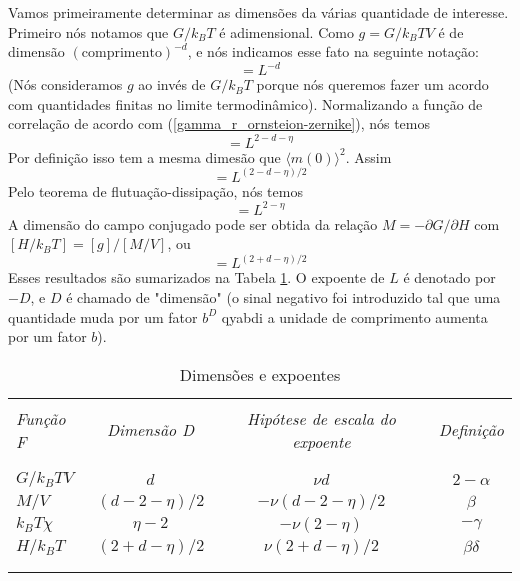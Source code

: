 Vamos primeiramente determinar as dimensões da várias quantidade de interesse. Primeiro nós notamos que $G/k_{B}T$ é adimensional. Como $g=G/k_{B}TV$ é de dimensão $(\text{comprimento})^{-d}$, e nós indicamos esse fato na seguinte notação:
\begin{equation}
[g]=L^{-d}
\end{equation}
(Nós consideramos $g$ ao invés de $G/k_{B}T$ porque nós queremos fazer um acordo com quantidades finitas no limite termodinâmico). Normalizando a função de correlação de acordo com (\ref{gamma_r_ornsteion-zernike}), nós temos
\begin{equation}
[\Gamma(x)]=L^{2-d-\eta}
\end{equation}
Por definição isso tem a mesma dimesão que $\langle m(0)\rangle^{2}$. Assim
\begin{equation}
[M/V]=L^{(2-d-\eta)/2}
\end{equation}
Pelo teorema de flutuação-dissipação, nós temos
\begin{equation}
[k_{B}T\chi]=L^{2-\eta}
\end{equation}
A dimensão do campo conjugado pode ser obtida da relação $M=-\partial G/\partial H$ com $[H/k_{B}T]=[g]/[M/V]$, ou
\begin{equation}
[H/k_{B}T]=L^{(2+d-\eta)/2}
\end{equation}
Esses resultados são sumarizados na Tabela \ref{dimensoes_e_expoentes}. O expoente de $L$ é denotado por $-D$, e $D$ é chamado de "dimensão" (o sinal negativo foi introduzido tal que uma quantidade muda por um fator $b^{D}$ qyabdi a unidade de comprimento aumenta por um fator $b$).

\begin{table}[h]
\renewcommand{\tablename}{{\bf Tabela}}
\caption{Dimensões e expoentes}
\begin{center}
\vspace{0.2cm}
\begin{tabular}{l c c c}
\hline
\\[-0.3cm]
{\it Função F} & {\it Dimensão D} & {\it Hipótese de escala do expoente} & {\it Definição} \\
\\[-0.4cm]
\hline
\\[-0.3cm]
$G/k_{B}TV$  & $d$            & $\nu d$            & $2-\alpha$     \\
$M/V$        & $(d-2-\eta)/2$ & $-\nu(d-2-\eta)/2$ & $\beta$        \\
$k_{B}T\chi$ & $\eta-2$       & $-\nu(2-\eta)$     & $-\gamma$      \\
$H/k_{B}T$   & $(2+d-\eta)/2$ & $\nu(2+d-\eta)/2$  & $\beta \delta$ \\
\\[-0.3cm]
\hline\\
\end{tabular}
\end{center}
\label{dimensoes_e_expoentes}
\end{table}

